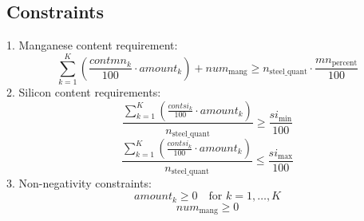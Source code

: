 \documentclass{article}
\begin{document}
\subsection*{Constraints}
1. Manganese content requirement:
\[
\sum_{k=1}^{K} \left( \frac{contmn_k}{100} \cdot amount_k \right) + num_{\text{mang}} \geq n_{\text{steel\_quant}} \cdot \frac{mn_{\text{percent}}}{100}
\]
2. Silicon content requirements:
\[
\frac{\sum_{k=1}^{K} \left( \frac{contsi_k}{100} \cdot amount_k \right)}{n_{\text{steel\_quant}}} \geq \frac{si_{\text{min}}}{100}
\]
\[
\frac{\sum_{k=1}^{K} \left( \frac{contsi_k}{100} \cdot amount_k \right)}{n_{\text{steel\_quant}}} \leq \frac{si_{\text{max}}}{100}
\]
3. Non-negativity constraints:
\[
amount_k \geq 0 \quad \text{for } k = 1, \ldots, K
\]
\[
num_{\text{mang}} \geq 0
\]
\end{document}
